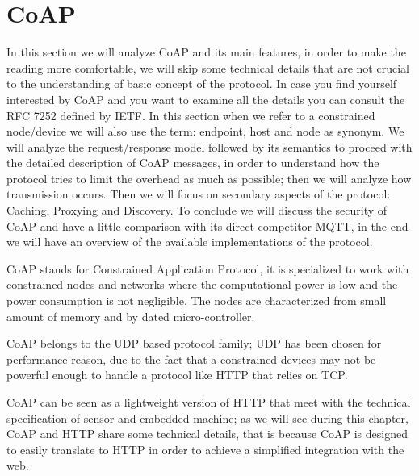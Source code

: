 
	\section{CoAP}
	In this section we will analyze CoAP and its main features, in order to make the reading more comfortable,
	we will skip some technical details that are not crucial to the understanding of basic concept of the protocol.\newline
	In case you find yourself interested by CoAP and you want to examine all the details you can consult
	the RFC 7252 defined by IETF\cite{rfccoap}. \newline
	In this section when we refer to a constrained node/device we will also use the term: endpoint, host and node as synonym.\newline
	We will analyze the request/response model followed by its semantics to proceed with the detailed description of CoAP messages, in order to understand how the protocol tries to limit the overhead as much as possible; then we will analyze how transmission occurs.\newline
	Then we will focus on secondary aspects of the protocol: Caching, Proxying and Discovery.\newline
	To conclude we will discuss the security of CoAP and have a little comparison with its direct competitor MQTT, in the end we will have an overview of the available implementations of the protocol.\newline
	
	CoAP stands for Constrained Application Protocol, it is specialized to work with constrained nodes and networks where the computational power is low and the power consumption is not negligible.\newline
	The nodes are characterized from small amount of memory and by dated micro-controller.\newline

	CoAP belongs to the UDP based protocol family; UDP has been chosen for performance reason, due to the fact that a constrained devices may not be powerful enough to handle a protocol like HTTP that relies on TCP.\newline
	
	CoAP can be seen as a lightweight version of HTTP that meet with the technical specification of sensor and embedded machine; as we will see during this chapter, CoAP and HTTP share some technical details, that is because CoAP is designed to easily translate to HTTP in order to achieve a simplified integration with the web.\newline

